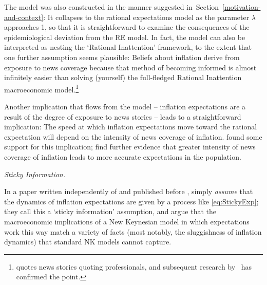 The model was also constructed in the manner suggested in~Section~\ref{motivation-and-context}: It collapses to the rational expectations model as the parameter $\lambda$ approaches 1, so that it is straightforward to examine the consequences of the epidemiological deviation from the RE model.  In fact, the model can also be interpreted as nesting the `Rational Inattention' framework, to the extent that one further assumption seems plausible:  Beliefs about inflation derive from exposure to news coverage because that method of becoming informed is almost infinitely easier than solving (yourself) the full-fledged Rational Inattention macroeconomic model.\footnote{\cite{carroll2003macroeconomic} quotes news stories quoting professionals, and subsequent research by~\cite{lamla2019} has confirmed the point.}

Another implication that flows from the model -- inflation expectations are a result of the degree of exposure to news stories -- leads to a straightforward implication:  The speed at which inflation expectations move toward the rational expectation will depend on the intensity of news coverage of inflation.  \cite{carroll2003macroeconomic} found some support for this implication; \cite{lamla2014role} find further evidence that greater intensity of news coverage of inflation leads to more accurate expectations in the population.



\medskip
\noindent\textit{Sticky Information.}

In a paper written independently of and published before \cite{carroll2003macroeconomic}, \cite{mr2002Sticky} simply \textit{assume} that the dynamics of inflation expectations are given by a process like \eqref{eq:StickyExp}; they call this a `sticky information' assumption, and argue that the macroeconomic implications of a New Keynesian model in which expectations work this way match a variety of facts (most notably, the sluggishness of inflation dynamics) that standard NK models cannot capture.

